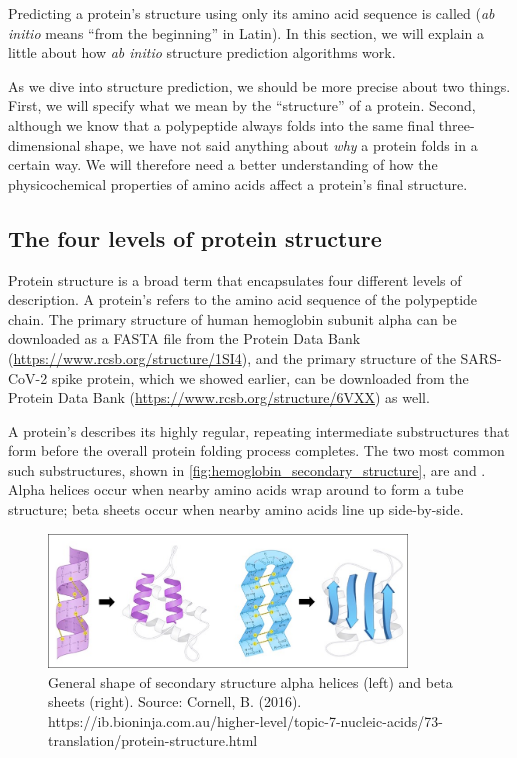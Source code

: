 Predicting a protein’s structure using only its amino acid sequence is called  (\textit{ab initio} means “from the beginning” in Latin). In this section, we will explain a little about how \textit{ab initio} structure prediction algorithms work.

As we dive into structure prediction, we should be more precise about two things. First, we will specify what we mean by the ``structure'' of a protein. Second, although we know that a polypeptide always folds into the same final three-dimensional shape, we have not said anything about \textit{why} a protein folds in a certain way. We will therefore need a better understanding of how the physicochemical properties of amino acids affect a protein's final structure.

\FloatBarrier
{}
\subsection{The four levels of protein structure}

Protein structure is a broad term that encapsulates four different levels of description. A protein's  refers to the amino acid sequence of the polypeptide chain. The primary structure of human hemoglobin subunit alpha can be downloaded as a FASTA file from the Protein Data Bank (\url{https://www.rcsb.org/structure/1SI4}), and the primary structure of the SARS-CoV-2 spike protein, which we showed earlier, can be downloaded from the Protein Data Bank (\url{https://www.rcsb.org/structure/6VXX}) as well.

A protein's  describes its highly regular, repeating intermediate substructures that form before the overall protein folding process completes. The two most common such substructures, shown in \autoref{fig:hemoglobin_secondary_structure}, are  and . Alpha helices occur when nearby amino acids wrap around to form a tube structure; beta sheets occur when nearby amino acids line up side-by-side.\\

\begin{figure}[h]
	\centering
	\mySfFamily
	\includegraphics[width = 0.85\textwidth]{../images/hemoglobin_secondary_structure.png}
	\caption{General shape of secondary structure alpha helices (left) and beta sheets (right). Source: Cornell, B. (2016). https://ib.bioninja.com.au/higher-level/topic-7-nucleic-acids/73-translation/protein-structure.html}
	\label{fig:hemoglobin_secondary_structure}
\end{figure}

